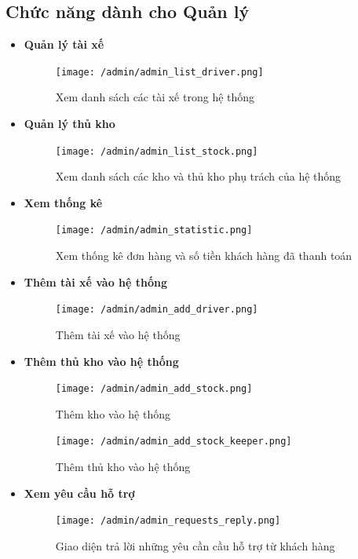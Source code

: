 \subsection{Chức năng dành cho Quản lý}
\begin{itemize}
	\item \textbf{Quản lý tài xế}
	\begin{figure}[H]
		\texttt{[image: /admin/admin\_list\_driver.png]}
		\centering
		\caption{Xem danh sách các tài xế trong hệ thống}
	\end{figure}
	
	
	\item \textbf{Quản lý thủ kho}
	\begin{figure}[H]
		\texttt{[image: /admin/admin\_list\_stock.png]}
		\centering
		\caption{Xem danh sách các kho và thủ kho phụ trách của hệ thống}
	\end{figure}

	\item \textbf{Xem thống kê}
	\begin{figure}[H]
		\texttt{[image: /admin/admin\_statistic.png]}
		\centering
		\caption{Xem thống kê đơn hàng và số tiền khách hàng đã thanh toán}
	\end{figure}

	\item \textbf{Thêm tài xế vào hệ thống}
	\begin{figure}[H]
		\texttt{[image: /admin/admin\_add\_driver.png]}
		\centering
		\caption{Thêm tài xế vào hệ thống}
	\end{figure}


	\item \textbf{Thêm thủ kho vào hệ thống}
	\begin{figure}[H]
		\texttt{[image: /admin/admin\_add\_stock.png]}
		\centering
		\caption{Thêm kho vào hệ thống}
	\end{figure}
	
	\begin{figure}[H]
		\texttt{[image: /admin/admin\_add\_stock\_keeper.png]}
		\centering
		\caption{Thêm thủ kho vào hệ thống}
	\end{figure}

	\item \textbf{Xem yêu cầu hỗ trợ}
	\begin{figure}[H]
		\texttt{[image: /admin/admin\_requests\_reply.png]}
		\centering
		\caption{Giao diện trả lời những yêu cần cầu hỗ trợ từ khách hàng}
	\end{figure}
	

\end{itemize}
